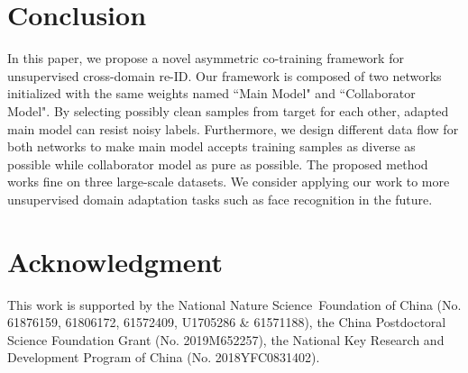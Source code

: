 \documentclass[letterpaper]{article} \usepackage{aaai20}  \usepackage{times}  \usepackage{helvet} \usepackage{courier}  \usepackage[hyphens]{url}  \usepackage{graphicx} \urlstyle{rm} \def\UrlFont{\rm}  \usepackage{graphicx}  \frenchspacing  \setlength{\pdfpagewidth}{8.5in}  \setlength{\pdfpageheight}{11in}  \usepackage{color}
\begin{document}
\section{Conclusion}
In this paper, we propose a novel asymmetric co-training framework for unsupervised cross-domain re-ID. Our framework is composed of two networks initialized with the same weights named ``Main Model" and ``Collaborator Model". By selecting possibly clean samples from target for each other, adapted main model can resist noisy labels. Furthermore, we design different data flow for both networks to make main model accepts training samples as diverse as possible while collaborator model as pure as possible. The proposed method works fine on three large-scale datasets. We consider applying our work to more unsupervised domain adaptation tasks such as face recognition in the future.

\section*{Acknowledgment}
This work is supported by the National Nature Science Foundation of China (No. 61876159, 61806172, 61572409, U1705286 \& 61571188), the China Postdoctoral Science Foundation Grant (No. 2019M652257), the National Key Research and Development Program of China (No. 2018YFC0831402). 




\end{document}
